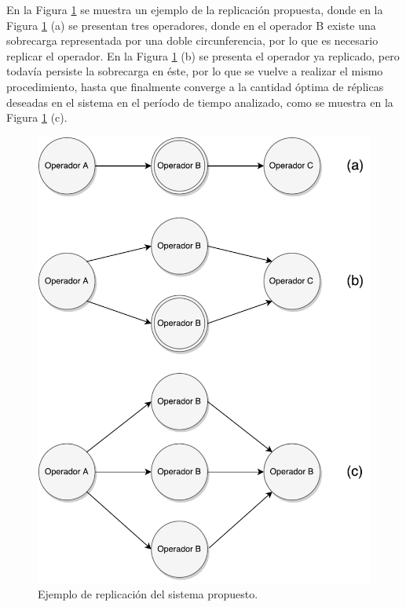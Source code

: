 En la Figura \ref{fig:ejReplicacion} se muestra un ejemplo de la replicación propuesta, donde en la Figura \ref{fig:ejReplicacion} (a) se presentan tres operadores, donde en el operador B existe una sobrecarga representada por una doble circunferencia, por lo que es necesario replicar el operador. En la Figura \ref{fig:ejReplicacion} (b) se presenta el operador ya replicado, pero todavía persiste la sobrecarga en éste, por lo que se vuelve a realizar el mismo procedimiento, hasta que finalmente converge a la cantidad óptima de réplicas deseadas en el sistema en el período de tiempo analizado, como se muestra en la Figura \ref{fig:ejReplicacion} (c).

\begin{figure}[!hb]
	\centering
		\includegraphics[scale=0.6]{images/EjReplicacion.pdf}
	\caption{Ejemplo de replicación del sistema propuesto.}
	\label{fig:ejReplicacion}
\end{figure}

